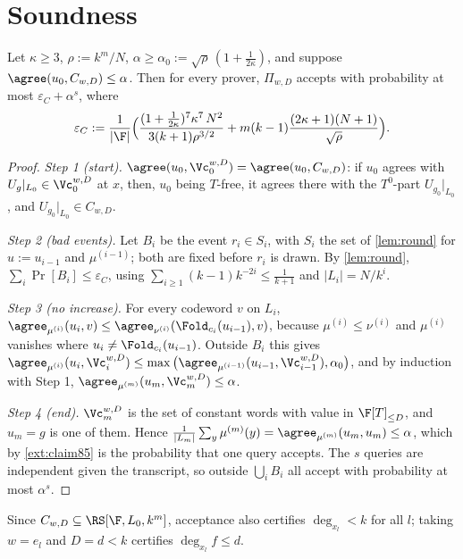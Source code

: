 \section{Soundness}

\begin{theorem}\label{thm:main}
Let $\kappa\ge3$, $\rho:=k^m/N$, $\alpha\ge\alpha_0:=\sqrt\rho\,(1+\frac1{2\kappa})$, and
suppose $\agree(u_0,C_{w,D})\le\alpha$. Then for every prover, $\Pi_{w,D}$ accepts with
probability at most $\varepsilon_C+\alpha^s$, where
\[
\varepsilon_C:=\frac1{|\F|}\Big(\frac{(1+\frac1{2\kappa})^7\kappa^7\,N^2}{3(k+1)\rho^{3/2}}
+m(k-1)\frac{(2\kappa+1)(N+1)}{\sqrt\rho}\Big).
\]
\end{theorem}

\begin{proof}
\emph{Step 1 (start).} $\agree(u_0,\Vc_0^{w,D})=\agree(u_0,C_{w,D})$: if $u_0$ agrees with
$U_g|_{L_0}\in\Vc_0^{w,D}$ at $x$, then, $u_0$ being $T$-free, it agrees there with the
$T^0$-part $U_{g_0}|_{L_0}$, and $U_{g_0}|_{L_0}\in C_{w,D}$.

\emph{Step 2 (bad events).} Let $B_i$ be the event $r_i\in S_i$, with $S_i$ the set of
\cref{lem:round} for $u:=u_{i-1}$ and $\mu^{(i-1)}$; both are fixed before $r_i$ is
drawn. By \cref{lem:round},
$\sum_i\Pr[B_i]\le\varepsilon_C$, using $\sum_{i\ge1}(k-1)k^{-2i}\le\frac1{k+1}$ and
$|L_i|=N/k^i$.

\emph{Step 3 (no increase).} For every codeword $v$ on $L_i$,
$\agree_{\mu^{(i)}}(u_i,v)\le\agree_{\nu^{(i)}}(\Fold_{c_i}(u_{i-1}),v)$, because
$\mu^{(i)}\le\nu^{(i)}$ and $\mu^{(i)}$ vanishes where $u_i\ne\Fold_{c_i}(u_{i-1})$. Outside
$B_i$ this gives
$\agree_{\mu^{(i)}}(u_i,\Vc_i^{w,D})\le\max\big(\agree_{\mu^{(i-1)}}(u_{i-1},\Vc_{i-1}^{w,D}),\alpha_0\big)$,
and by induction with Step 1, $\agree_{\mu^{(m)}}(u_m,\Vc_m^{w,D})\le\alpha$.

\emph{Step 4 (end).} $\Vc_m^{w,D}$ is the set of constant words with value in
$\F[T]_{\le D}$, and $u_m=g$ is one of them. Hence
$\frac1{|L_m|}\sum_y\mu^{(m)}(y)=\agree_{\mu^{(m)}}(u_m,u_m)\le\alpha$, which by
\cref{ext:claim85} is the probability that one query accepts. The $s$ queries are
independent given the transcript, so outside $\bigcup_iB_i$ all accept with probability
at most $\alpha^s$.
\end{proof}

\begin{remark}
Since $C_{w,D}\subseteq\RS[\F,L_0,k^m]$, acceptance also certifies
$\deg_{x_l}<k$ for all $l$; taking $w=e_l$ and $D=d<k$ certifies $\deg_{x_l}f\le d$.
\end{remark}

